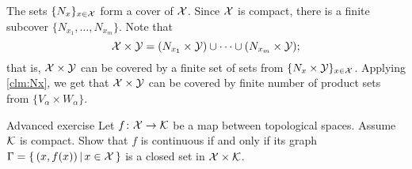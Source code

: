 The sets $\{N_x\}_{x\in\mathcal{X}}$ form a cover of $\mathcal{X}$.
Since $\mathcal{X}$ is compact, 
there is a finite subcover $\{N_{x_1},\dots,N_{x_m}\}$.
Note that 
\[\mathcal{X}\times\mathcal{Y}=(N_{x_1}\times \mathcal{Y})\cup\dots\cup (N_{x_m}\times \mathcal{Y});\]
that is, $\mathcal{X}\times\mathcal{Y}$ can be covered by a finite set of sets from $\{N_x\times \mathcal{Y}\}_{x\in\mathcal{X}}$.
Applying \ref{clm:Nx}, we get that $\mathcal{X}\times\mathcal{Y}$ can be covered by finite number of product sets from $\{V_\alpha\times W_\alpha\}$.
\qeds

\begin{thm}{Advanced exercise}\label{ex:closed-graph} 
Let $f\colon\mathcal{X}\to\mathcal{K}$ be a map between topological spaces.
Assume $\mathcal{K}$ is compact.
Show that $f$ is continuous if and only if its graph $\Gamma=\left\{\,{(x,f(x))}\,\middle|\,{x\in\mathcal{X}}\,\right\}$ is a closed set in $\mathcal{X}\times\mathcal{K}$. 
\end{thm}

